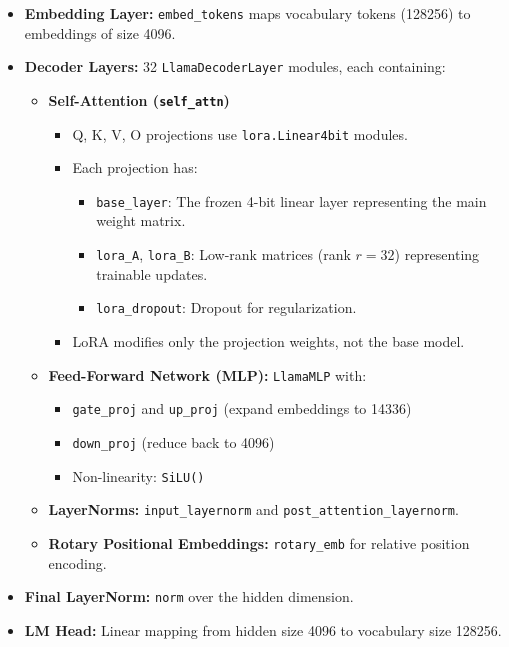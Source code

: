\begin{itemize}
    \item \textbf{Embedding Layer:} \texttt{embed\_tokens} maps vocabulary tokens (128256) to embeddings of size 4096.
    \item \textbf{Decoder Layers:} 32 \texttt{LlamaDecoderLayer} modules, each containing:
        \begin{itemize}
            \item \textbf{Self-Attention (\texttt{self\_attn})}
                \begin{itemize}
                    \item Q, K, V, O projections use \texttt{lora.Linear4bit} modules.
                    \item Each projection has:
                        \begin{itemize}
                            \item \texttt{base\_layer}: The frozen 4-bit linear layer representing the main weight matrix.
                            \item \texttt{lora\_A}, \texttt{lora\_B}: Low-rank matrices (rank $r=32$) representing trainable updates.
                            \item \texttt{lora\_dropout}: Dropout for regularization.
                        \end{itemize}
                    \item LoRA modifies only the projection weights, not the base model.
                \end{itemize}
            \item \textbf{Feed-Forward Network (MLP):} \texttt{LlamaMLP} with:
                \begin{itemize}
                    \item \texttt{gate\_proj} and \texttt{up\_proj} (expand embeddings to 14336)  
                    \item \texttt{down\_proj} (reduce back to 4096)  
                    \item Non-linearity: \texttt{SiLU()}
                \end{itemize}
            \item \textbf{LayerNorms:} \texttt{input\_layernorm} and \texttt{post\_attention\_layernorm}.
            \item \textbf{Rotary Positional Embeddings:} \texttt{rotary\_emb} for relative position encoding.
        \end{itemize}
    \item \textbf{Final LayerNorm:} \texttt{norm} over the hidden dimension.
    \item \textbf{LM Head:} Linear mapping from hidden size 4096 to vocabulary size 128256.
\end{itemize}

